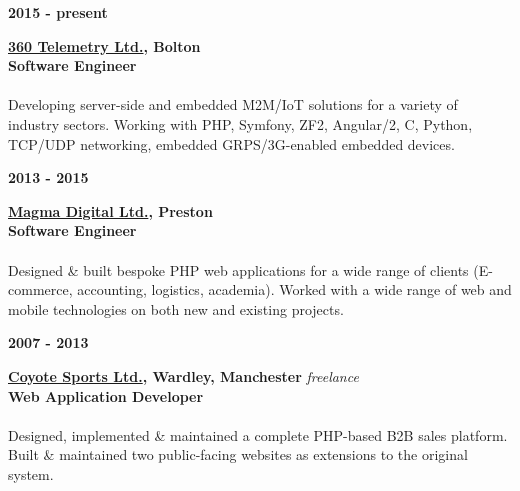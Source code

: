 
\begin{minipage}[t]{0.20\linewidth}
    \textbf{2015 - present}
\end{minipage} 
\begin{minipage}[t]{0.80\linewidth}
    \textbf{\href{http://360telemetry.com}{360 Telemetry Ltd.}, Bolton}\\
    \textbf{Software Engineer}\\
    \\
    Developing server-side and embedded M2M/IoT solutions for a variety of industry sectors. Working with PHP, Symfony, ZF2, Angular/2, C\textsharp, Python, TCP/UDP networking, embedded GRPS/3G-enabled embedded devices.
\end{minipage}

\vspace{5mm}


\begin{minipage}[t]{0.20\linewidth}
    \textbf{2013 - 2015}
\end{minipage} 
\begin{minipage}[t]{0.80\linewidth}
    \textbf{\href{http://magmadigital.co.uk}{Magma Digital Ltd.}, Preston}\\
    \textbf{Software Engineer}\\
    \\
    Designed \& built bespoke PHP web applications for a wide range of clients (E-commerce, accounting, logistics, academia). Worked with a wide range of web and mobile technologies on both new and existing projects.
    
\end{minipage}

\vspace{5mm}


\begin{minipage}[t]{0.20\linewidth}
    \textbf{2007 - 2013}
\end{minipage} 
\begin{minipage}[t]{0.80\linewidth}
    \textbf{\href{http://coyote-sports.com}{Coyote Sports Ltd.}, Wardley, Manchester} \textemdash  \emph{ freelance}\\
    \textbf{Web Application Developer}\\
    \\
    Designed, implemented \& maintained a complete PHP-based B2B sales platform. Built \& maintained two public-facing websites as extensions to the original system.
\end{minipage}
